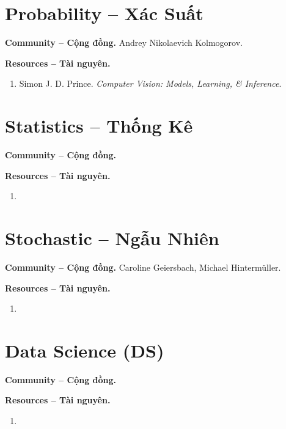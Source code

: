 \documentclass{article}
\begin{document}

\section{Probability -- Xác Suất}
\textbf{\textsf{Community -- Cộng đồng.}} {\sc Andrey Nikolaevich Kolmogorov}.

\noindent\textbf{\textsf{Resources -- Tài nguyên.}}
\begin{enumerate}
	\item {\sc Simon J. D. Prince}. {\it Computer Vision: Models, Learning, \& Inference}.
\end{enumerate}


\section{Statistics -- Thống Kê}
\textbf{\textsf{Community -- Cộng đồng.}} 

\noindent\textbf{\textsf{Resources -- Tài nguyên.}}
\begin{enumerate}
	\item 
\end{enumerate}


\section{Stochastic -- Ngẫu Nhiên}
\textbf{\textsf{Community -- Cộng đồng.}} {\sc Caroline Geiersbach}, {\sc Michael Hinterm\"uller}.

\noindent\textbf{\textsf{Resources -- Tài nguyên.}}
\begin{enumerate}
	\item 
\end{enumerate}


\section{Data Science (DS)}
\textbf{\textsf{Community -- Cộng đồng.}} 

\noindent\textbf{\textsf{Resources -- Tài nguyên.}}
\begin{enumerate}
	\item 
\end{enumerate}
\end{document}
